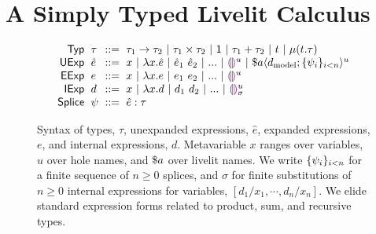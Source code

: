 \section{A Simply Typed Livelit Calculus}\label{sec:livelit-calculus}

\begin{figure}
    \[
    \arraycolsep=3pt\begin{array}{rlcl}
        \mathsf{Typ} & \tau & ::= &
                                    \tarr{\tau_1}{\tau_2} ~\vert~
                                    \tprod{\tau_1}{\tau_2} ~\vert~
                                    \tunit ~\vert~
                                    \tsum{\tau_1}{\tau_2} ~\vert~
                                    t ~\vert~
                                    \trec{t}{\tau}\\
        \mathsf{UExp} & \hat{e} & ::= & 
                                 x ~\vert~
                                 \hlam{x}{\hat e} ~\vert~
                                 \hap{\hat e_1}{\hat e_2} ~\vert~
                                 ... ~\vert~
                                 \hehole{u} ~\vert~
                                 \haplivelit{u}{a}{\dtxt{model}}{\splices}\\
        \mathsf{EExp} & e & ::= & x ~\vert~ \hlam{x}{e} ~\vert~ \hap{e_1}{e_2} ~\vert~ ... ~\vert~ \hehole{u}\\
        \mathsf{IExp} & d & ::= & x ~\vert~ \hlam{x}{d} ~\vert~ \hap{d_1}{d_2} ~\vert~ ... ~\vert~ \dehole{u}{\sigma}\\
        \mathsf{Splice} & \psi & ::= & \hsplice{\hat e}{\tau}
    \end{array}
    \]
    \caption{Syntax of types, $\tau$, unexpanded expressions, $\hat{e}$, expanded expressions, $e$, and internal expressions, $d$.
    Metavariable $x$ ranges over variables, $u$ over hole names, and $\$a$ over livelit names.
    We write $\{\psi_i\}_{i < n}$ for a finite sequence of $n \geq 0$ splices,
    and $\sigma$ for finite substitutions of $n \geq 0$ internal expressions for variables, $[d_1/x_1, \cdots, d_n/x_n]$.
    We elide standard expression forms
    related to product, sum, and recursive types.
    }
    \label{fig:syntax}
    \end{figure}

